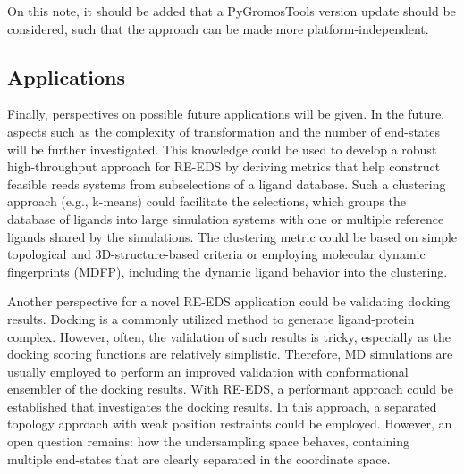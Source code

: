 On this note, it should be added that a PyGromosTools\cite{Lehner2021} version update should be considered, such that the approach can be made more platform-independent.

\subsection{Applications}
Finally, perspectives on possible future applications will be given. 
In the future, aspects such as the complexity of transformation and the number of end-states will be further investigated. 
This knowledge could be used to develop a robust high-throughput approach for RE-EDS by deriving metrics that help construct feasible reeds systems from subselections of a ligand database. Such a clustering approach (e.g., k-means) could facilitate the selections, which groups the database of ligands into large simulation systems with one or multiple reference ligands shared by the simulations.  The clustering metric could be based on simple topological and 3D-structure-based criteria or employing molecular dynamic fingerprints (MDFP), including the dynamic ligand behavior into the clustering.\cite{Riniker2017}


 Another perspective for a novel RE-EDS application could be validating docking results. Docking is a commonly utilized method to generate ligand-protein complex. \cite{Zhao2015, Eberhardt2021, Morris2009} However, often, the validation of such results is tricky, especially as the docking scoring functions are relatively simplistic.\cite{Chen2015} Therefore, MD simulations are usually employed to perform an improved validation with conformational ensembler of the docking results.\cite{Zhao2015, Feng2015, Sokkar2011, Chavda2019} With RE-EDS, a performant approach could be established that investigates the docking results. In this approach, a separated topology approach \cite{Rocklin2013} with weak position restraints could be employed. However, an open question remains: how the undersampling space behaves, containing multiple end-states that are clearly separated in the coordinate space. 



